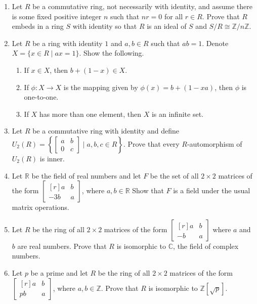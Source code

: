 \documentclass{article}
\theoremstyle{definition}
\newcommand{\Z}{\mathbb{Z}}
\newcommand{\R}{\mathbb{R}}
\newcommand{\C}{\mathbb{C}}
\newcommand{\mat}[1]{\begin{bmatrix*}[r] #1 \end{bmatrix*}}
\begin{document}
\begin{enumerate}
            \item Let $R$ be a commutative ring, not necessarily with identity, and assume there is some fixed positive integer $n$ such that $nr=0$ for all $r\in R$. Prove that $R$ embeds in a ring $S$ with identity so that $R$ is an ideal of $S$ and $S/R\cong \Z/n\Z$.
            
            \item Let $R$ be a ring with identity $1$ and $a,b\in R$ such that $ab=1$. Denote $X=\{x\in R\mid  ax=1\}$. Show the following.
            
            \begin{enumerate}
                \item If $x\in X$, then $b+(1-x)\in X$.
                \item If $\phi:X\to X$ is the mapping given by $\phi(x)=b+(1-xa)$, then $\phi$ is one-to-one.
                \item If $X$ has more than one element, then $X$ is an infinite set.
            \end{enumerate}

            \item Let $R$ be a commutative ring with identity and define $U_2(R)=\left\{\begin{bmatrix} a&b\\0&c \end{bmatrix} \mid  a,b,c\in R \right\}$. Prove that every $R$-automorphism of $U_2(R)$ is inner.
            
            \item Let $\R$ be the field of real numbers and let $F$ be the set of all $2\times 2$ matrices of the form $\mat{a & b\\-3b&a}$, where $a,b\in \R$ Show that $F$ is a field under the usual matrix operations.
            
            \item Let $R$ be the ring of all $2\times 2$ matrices of the form $\mat{a &b\\-b&a}$ where $a$ and $b$ are real numbers. Prove that $R$ is isomorphic to $\C$, the field of complex numbers.
            
            \item Let $p$ be a prime and let $R$ be the ring of all $2\times 2$ matrices of the form $\mat{a&b\\pb&a}$, where $a,b\in \Z$. Prove that $R$ is isomorphic to $\Z[\sqrt{p}]$.
            

\end{enumerate}
\end{document}
